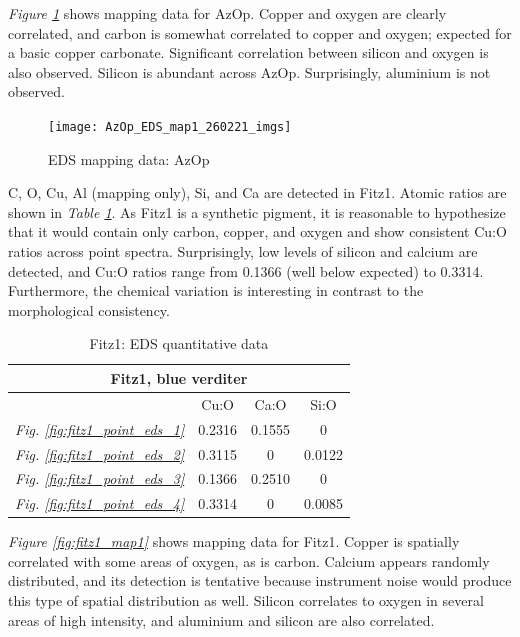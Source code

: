 \textit{Figure \ref{fig:azop_map1}} shows mapping data for AzOp. Copper and oxygen are clearly correlated, and carbon is somewhat correlated to copper and oxygen; expected for a basic copper carbonate. Significant correlation between silicon and oxygen is also observed. Silicon is abundant across AzOp. Surprisingly, aluminium is not observed. 

\begin{figure}[H]
\centering
  \texttt{[image: AzOp\_EDS\_map1\_260221\_imgs]}
\caption[EDS mapping data: AzOp]{EDS mapping data: AzOp}
\label{fig:azop_map1}
\end{figure}


C, O, Cu, Al (mapping only), Si, and Ca are detected in Fitz1. Atomic ratios are shown in \textit{Table \ref{table:fitz1_ratios}}. As Fitz1 is a synthetic pigment, it is reasonable to hypothesize that it would contain only carbon, copper, and oxygen and show consistent Cu:O ratios across point spectra. Surprisingly, low levels of silicon and calcium are detected, and Cu:O ratios range from 0.1366 (well below expected) to 0.3314. Furthermore, the chemical variation is interesting in contrast to the morphological consistency.

\begin{table}[H]
\caption{Fitz1: EDS quantitative data}
\centering
\label{table:fitz1_ratios}
\begin{tabular}{c c c c}
\toprule
\multicolumn{4}{c}{Fitz1, blue verditer} \\
\midrule
~ & Cu:O & Ca:O & Si:O \\
\midrule
\textit{Fig. \ref{fig:fitz1_point_eds_1}} & 0.2316 & 0.1555 & 0 \\
\textit{Fig. \ref{fig:fitz1_point_eds_2}} & 0.3115 & 0 & 0.0122 \\
\textit{Fig. \ref{fig:fitz1_point_eds_3}} & 0.1366 & 0.2510 & 0 \\
\textit{Fig. \ref{fig:fitz1_point_eds_4}} & 0.3314 & 0 & 0.0085 \\
\bottomrule
\end{tabular}
\end{table}

\textit{Figure \ref{fig:fitz1_map1}} shows mapping data for Fitz1. Copper is spatially correlated with some areas of oxygen, as is carbon. Calcium appears randomly distributed, and its detection is tentative because instrument noise would produce this type of spatial distribution as well. Silicon correlates to oxygen in several areas of high intensity, and aluminium and silicon are also correlated.

